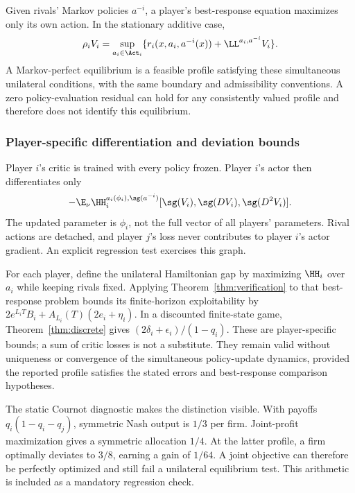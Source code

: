 Given rivals' Markov policies $a^{-i}$, a player's best-response equation maximizes only its own action. In the stationary additive case,
\begin{equation}\label{eq:game}
 \rho_i V_i=\sup_{a_i\in\Act_i}\{r_i(x,a_i,a^{-i}(x))+\LL^{a_i,a^{-i}}V_i\}.
\end{equation}
A Markov-perfect equilibrium is a feasible profile satisfying these simultaneous unilateral conditions, with the same boundary and admissibility conventions. A zero policy-evaluation residual can hold for any consistently valued profile and therefore does not identify this equilibrium.

\subsubsection{Player-specific differentiation and deviation bounds}
Player $i$'s critic is trained with every policy frozen. Player $i$'s actor then differentiates only
\begin{equation}\label{eq:gameactor}
 -\E_\nu\HH_i^{a_i(\phi_i),\sg(a^{-i})}
       [\sg(V_i),\sg(DV_i),\sg(D^2V_i)].
\end{equation}
The updated parameter is $\phi_i$, not the full vector of all players' parameters. Rival actions are detached, and player $j$'s loss never contributes to player $i$'s actor gradient. An explicit regression test exercises this graph.

For each player, define the unilateral Hamiltonian gap by maximizing $\HH_i$ over $a_i$ while keeping rivals fixed. Applying Theorem~\ref{thm:verification} to that best-response problem bounds its finite-horizon exploitability by $2e^{L_iT}B_i+A_{L_i}(T)(2e_i+\eta_i)$. In a discounted finite-state game, Theorem~\ref{thm:discrete} gives $(2\delta_i+\epsilon_i)/(1-q_i)$. These are player-specific bounds; a sum of critic losses is not a substitute. They remain valid without uniqueness or convergence of the simultaneous policy-update dynamics, provided the reported profile satisfies the stated errors and best-response comparison hypotheses.

The static Cournot diagnostic makes the distinction visible. With payoffs $q_i(1-q_i-q_j)$, symmetric Nash output is $1/3$ per firm. Joint-profit maximization gives a symmetric allocation $1/4$. At the latter profile, a firm optimally deviates to $3/8$, earning a gain of $1/64$. A joint objective can therefore be perfectly optimized and still fail a unilateral equilibrium test. This arithmetic is included as a mandatory regression check.

